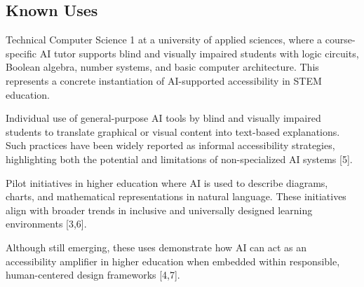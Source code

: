 \subsection*{Known Uses}



Technical Computer Science 1 at a university of applied sciences, where a course-specific AI tutor supports blind and visually impaired students with logic circuits, Boolean algebra, number systems, and basic computer architecture. This represents a concrete instantiation of AI-supported accessibility in STEM education.

Individual use of general-purpose AI tools by blind and visually impaired students to translate graphical or visual content into text-based explanations. Such practices have been widely reported as informal accessibility strategies, highlighting both the potential and limitations of non-specialized AI systems [5].

Pilot initiatives in higher education where AI is used to describe diagrams, charts, and mathematical representations in natural language. These initiatives align with broader trends in inclusive and universally designed learning environments [3,6].

Although still emerging, these uses demonstrate how AI can act as an accessibility amplifier in higher education when embedded within responsible, human-centered design frameworks [4,7].
